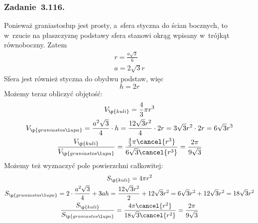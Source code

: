 \subsubsection*{Zadanie~3.116.}
Ponieważ graniastosłup jest prosty, a~sfera styczna do ścian bocznych, to w~rzucie na płaszczyznę podstawy sfera stanowi okrąg wpisany w~trójkąt równoboczny. Zatem
\begin{gather*}
    r = \frac{a\sqrt{3}}{6}\\
    a = 2\sqrt{3}r
\end{gather*}
Sfera jest również styczna do obydwu podstaw, więc
\begin{equation*}
    h = 2r
\end{equation*}
Możemy teraz obliczyć objętość:
\begin{gather*}
    V_\p{kuli}
    = \frac{4}{3}\pi r^3\\
    V_\p{graniastosłupa}
    = \frac{a^2\sqrt{3}}{4} \cdot h
    = \frac{12\sqrt{3}r^2}{4} \cdot 2r
    = 3\sqrt{3}r^2 \cdot 2r
    = 6\sqrt{3}r^3\\
    \frac{V_\p{kuli}}{V_\p{graniastosłupa}}
    = \frac{\frac{4}{3}\pi \cancel{r^3}}{6\sqrt{3}\cancel{r^3}}
    = \frac{2\pi}{9\sqrt{3}}
\end{gather*}
Możemy też wyznaczyć pole powierzchni całkowitej:
\begin{gather*}
    S_\p{kuli}
    = 4\pi r^2\\
    S_\p{graniastosłupa}
    = 2 \cdot \frac{a^2\sqrt{3}}{4} + 3ah
    = \frac{12\sqrt{3}r^2}{2} + 12\sqrt{3}r^2
    = 6\sqrt{3}r^2 + 12\sqrt{3}r^2
    = 18\sqrt{3}r^2\\
    \frac{S_\p{kuli}}{S_\p{graniastosłupa}}
    = \frac{4\pi \cancel{r^2}}{18\sqrt{3} \cancel{r^2}}
    = \frac{2\pi}{9\sqrt{3}}
\end{gather*}
